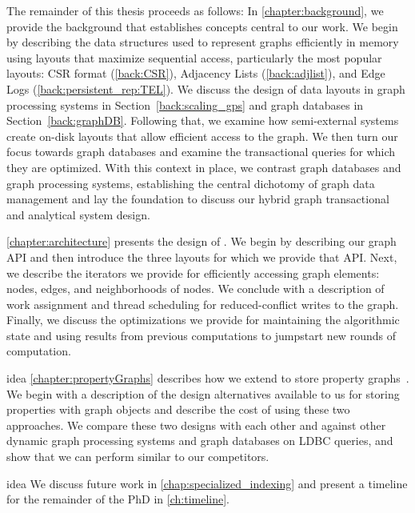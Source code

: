 The remainder of this thesis proceeds as follows:
In \autoref{chapter:background}, we provide the background that establishes concepts central to our work. 
We begin by describing the data structures used to represent graphs efficiently in memory using layouts that maximize sequential access, particularly the most popular layouts: \ac{CSR} format (\autoref{back:CSR}), Adjacency Lists (\autoref{back:adjlist}), and Edge Logs (\autoref{back:persistent_rep:TEL}).
We discuss the design of data layouts in graph processing systems in Section~\autoref{back:scaling_gps} and graph databases in Section~\ref{back:graphDB}.
Following that, we examine how semi-external systems create on-disk layouts that allow efficient access to the graph.
We then turn our focus towards graph databases and examine the transactional queries for which they are optimized.
With this context in place, we contrast graph databases and graph processing systems, establishing the central dichotomy of graph data management and lay the foundation to discuss our hybrid graph transactional and analytical system design.

\autoref{chapter:architecture} presents the design of \project{}.
We begin by describing our graph API and then introduce the three layouts for which we provide that API.
Next, we describe the iterators we provide for efficiently accessing graph elements: nodes, edges, and neighborhoods of nodes. We conclude with a description of work assignment and thread scheduling for reduced-conflict writes to the graph.
Finally, we discuss the optimizations we provide for maintaining the algorithmic state and using results from previous computations to jumpstart new rounds of computation.\\

\begin{statusbar}{idea}
\autoref{chapter:propertyGraphs} describes how we extend \project{} to store property graphs~\cite{angles2018property}.
We begin with a description of the design alternatives available to us for storing properties with graph objects and describe the cost of using these two approaches.
We compare these two designs with each other and against other dynamic graph processing systems and graph databases on LDBC queries, and show that we can perform similar to our competitors.
\end{statusbar}

\begin{statusbar}{idea}
We discuss future work in \autoref{chap:specialized_indexing} and present a timeline for the remainder of the PhD in \autoref{ch:timeline}.
\end{statusbar}